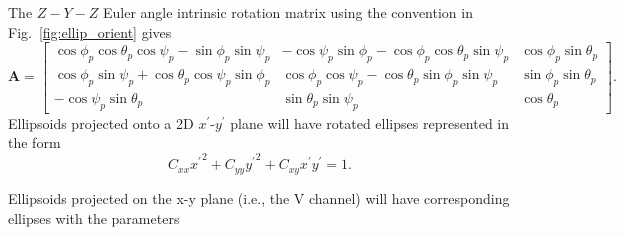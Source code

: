 \documentclass[amt, manuscript]{copernicus}
\begin{document}
The $Z-Y-Z$ Euler angle intrinsic rotation matrix using the convention in Fig.~\ref{fig:ellip_orient} gives 
\begin{equation}
\mathbf{A} = 
\begin{bmatrix}
\cos\phi_{p}\cos\theta_{p}\cos\psi_{p}-\sin\phi_p\sin\psi_p & -\cos\psi_p\sin\phi_p-\cos\phi_p\cos\theta_p\sin\psi_p & \cos\phi_p\sin\theta_p \\
\cos\phi_p\sin\psi_p+\cos\theta_p\cos\psi_p\sin\phi_p & \cos\phi_p\cos\psi_p-\cos\theta_p\sin\phi_p\sin\psi_p & \sin\phi_p\sin\theta_p \\
-\cos\psi_p\sin\theta_p & \sin\theta_p\sin\psi_p & \cos\theta_p
\end{bmatrix}.
\end{equation}
Ellipsoids projected onto a 2D $x^{\prime}$-$y^{\prime}$ plane will have rotated ellipses represented in the form
\begin{equation}
    C_{xx} {x^{\prime}}^{2} + C_{yy} {y^{\prime}}^{2} + C_{xy} x^{\prime} y^{\prime} = 1.
\end{equation}

Ellipsoids projected on the x-y plane (i.e., the V channel) will have corresponding ellipses with the parameters
\end{document}

